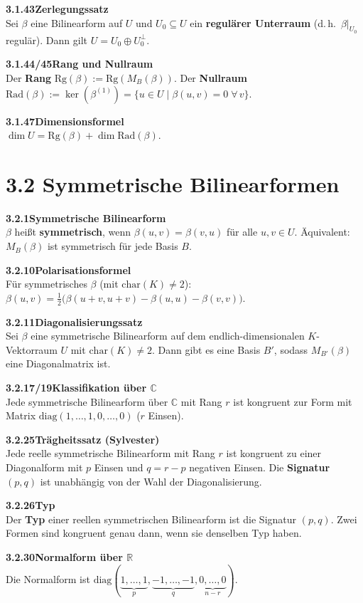 \documentclass[a4paper,12pt]{article}
\newcommand{\gentry}[3]{%
  \noindent\textbf{#1\quad #2}\nopagebreak\\[0.2em]
  #3\par\smallskip
}
\begin{document}
\gentry{3.1.43}{Zerlegungssatz}{%
  Sei $\beta$ eine Bilinearform auf $U$ und $U_0 \subseteq U$ ein \textbf{regulärer Unterraum} (d.\,h.\ $\beta|_{U_0}$ regulär). Dann gilt $U = U_0 \oplus U_0^\perp$.
}

\gentry{3.1.44/45}{Rang und Nullraum}{%
  Der \textbf{Rang} $\mathrm{Rg}(\beta) := \mathrm{Rg}(M_B(\beta))$.
  Der \textbf{Nullraum} $\mathrm{Rad}(\beta) := \ker(\beta^{(1)}) = \{u \in U \mid \beta(u,v) = 0 \; \forall\, v\}$.
}

\gentry{3.1.47}{Dimensionsformel}{%
  $\dim U = \mathrm{Rg}(\beta) + \dim \mathrm{Rad}(\beta)$.
}

\section*{3.2 \quad Symmetrische Bilinearformen}

\gentry{3.2.1}{Symmetrische Bilinearform}{%
  $\beta$ heißt \textbf{symmetrisch}, wenn $\beta(u,v) = \beta(v,u)$ für alle $u, v \in U$.
  Äquivalent: $M_B(\beta)$ ist symmetrisch für jede Basis $B$.
}

\gentry{3.2.10}{Polarisationsformel}{%
  Für symmetrisches $\beta$ (mit $\mathrm{char}(K) \neq 2$):
  $\beta(u,v) = \tfrac{1}{2}\bigl(\beta(u+v,u+v) - \beta(u,u) - \beta(v,v)\bigr)$.
}

\gentry{3.2.11}{Diagonalisierungssatz}{%
  Sei $\beta$ eine symmetrische Bilinearform auf dem endlich-dimensionalen $K$-Vektorraum $U$ mit $\mathrm{char}(K) \neq 2$. Dann gibt es eine Basis $B'$, sodass $M_{B'}(\beta)$ eine Diagonalmatrix ist.
}

\gentry{3.2.17/19}{Klassifikation über $\mathbb{C}$}{%
  Jede symmetrische Bilinearform über $\mathbb{C}$ mit Rang $r$ ist kongruent zur Form mit Matrix $\mathrm{diag}(1,\ldots,1,0,\ldots,0)$ ($r$ Einsen).
}

\gentry{3.2.25}{Trägheitssatz (Sylvester)}{%
  Jede reelle symmetrische Bilinearform mit Rang $r$ ist kongruent zu einer Diagonalform mit $p$ Einsen und $q = r-p$ negativen Einsen. Die \textbf{Signatur} $(p,q)$ ist unabhängig von der Wahl der Diagonalisierung.
}

\gentry{3.2.26}{Typ}{%
  Der \textbf{Typ} einer reellen symmetrischen Bilinearform ist die Signatur $(p,q)$. Zwei Formen sind kongruent genau dann, wenn sie denselben Typ haben.
}

\gentry{3.2.30}{Normalform über $\mathbb{R}$}{%
  Die Normalform ist $\mathrm{diag}(\underbrace{1,\ldots,1}_{p},\underbrace{-1,\ldots,-1}_{q},\underbrace{0,\ldots,0}_{n-r})$.
}
\end{document}
